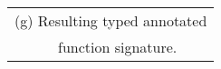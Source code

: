 \scriptsize
\begin{tabular}[t]{l}
	(g) Resulting typed annotated \\ \ \ \ \ \ \ function signature.
\end{tabular}